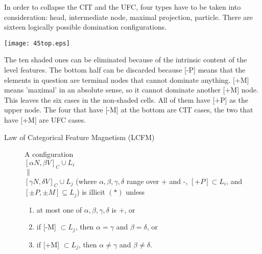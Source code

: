 \documentclass{article}
\begin{document}
In order to collapse the CIT and the UFC, four types have to be taken into consideration: head, intermediate node, maximal projection, particle. There are sixteen logically possible domination configurations.

\begin{example}
\texttt{[image: 45top.eps]}
   \end{example}

The ten shaded ones can be eliminated because of the intrinsic content of the level features. The bottom half can be discarded because [-P] means that the elements in question are terminal nodes that cannot dominate anything. [+M] means 'maximal' in an absolute sense, so it cannot dominate another [+M] node. This leaves the six cases in the non-shaded cells. All of them have [+P] as the upper node. The four that have [-M] at the bottom are CIT cases, the two that have [+M] are UFC cases. 
\begin{example}
\begin{description}
\item[Law of Categorical Feature Magnetism (LCFM) ]
A configuration\\
$[\alpha N, \beta V]_{C} \cup L_{i}$\\
$\|$\\
$[\gamma N, \delta V]_{C} \cup L_{j}$ (where $\alpha, \beta, \gamma, \delta$ range over + and -, $[+P] \subset L_{i}$, and $[\pm P,\pm M] \subseteq L_{j}$) is illicit $(*)$ unless 
\begin{enumerate} 
\item at most one of $\alpha, \beta, \gamma, \delta$ is +, or 
\item if [-M] $\subset L_{j}$, then $\alpha = \gamma$ and $\beta = \delta$, or
\item if [+M] $\subset L_{j}$, then $\alpha \neq \gamma$ and $\beta \neq \delta$.

 \end{enumerate}
\end{description}
 \end{example}







\begin{thebibliography}{100}

\citep*{Grimshaw:1991}
\citep*{Riemsdijk:1998a}
\citep*{Nikanne:1993}
\citep*{Riemsdijk:1990}
\citep*{Emonds:1985}
\end{thebibliography}
\end{document}
